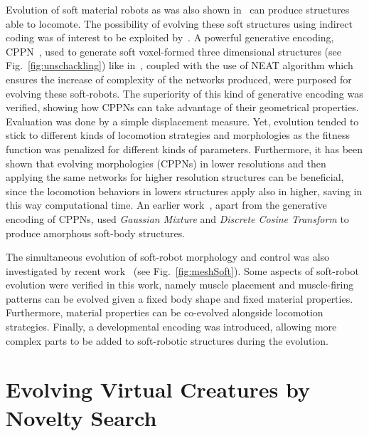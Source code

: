 Evolution of soft material robots as was also shown in~\citep{hiller2012automatic} can produce structures able to locomote. The possibility of evolving these soft structures using indirect coding was of interest to be exploited by~\citep{cheney2013unshackling}. A powerful generative encoding, CPPN~\citep{stanley2007compositional}, used to generate soft voxel-formed three dimensional structures (see Fig.~\ref{fig:unschackling}) like in~\citep{hiller2012automatic}, coupled with the use of NEAT algorithm which ensures the increase of complexity of the networks produced, were purposed for evolving these soft-robots. The superiority of this kind of generative encoding was verified, showing how CPPNs can take advantage of their geometrical properties. Evaluation was done by a simple displacement measure. Yet, evolution tended to stick to different kinds of locomotion strategies and morphologies as the fitness function was penalized for different kinds of parameters. Furthermore, it has been shown that evolving morphologies (CPPNs) in lower resolutions and then applying the same networks for higher resolution structures can be beneficial, since the locomotion behaviors in lowers structures apply also in higher, saving in this way computational time.  An earlier work~\citep{hiller2010evolving}, apart from the generative encoding of CPPNs, used \textit{Gaussian Mixture} and \textit{Discrete Cosine Transform} to produce amorphous soft-body structures.

The simultaneous evolution of soft-robot morphology and control was also investigated by recent work~\citep{rieffel2014growing} (see Fig.~\ref{fig:meshSoft}). Some aspects of soft-robot evolution were verified in this work, namely muscle placement and muscle-firing patterns can be evolved given a fixed body shape and fixed material properties. Furthermore, material properties can be co-evolved alongside locomotion strategies. Finally, a developmental encoding was introduced, allowing more complex parts to be added to soft-robotic structures during the evolution.


\section{Evolving Virtual Creatures by Novelty Search}

